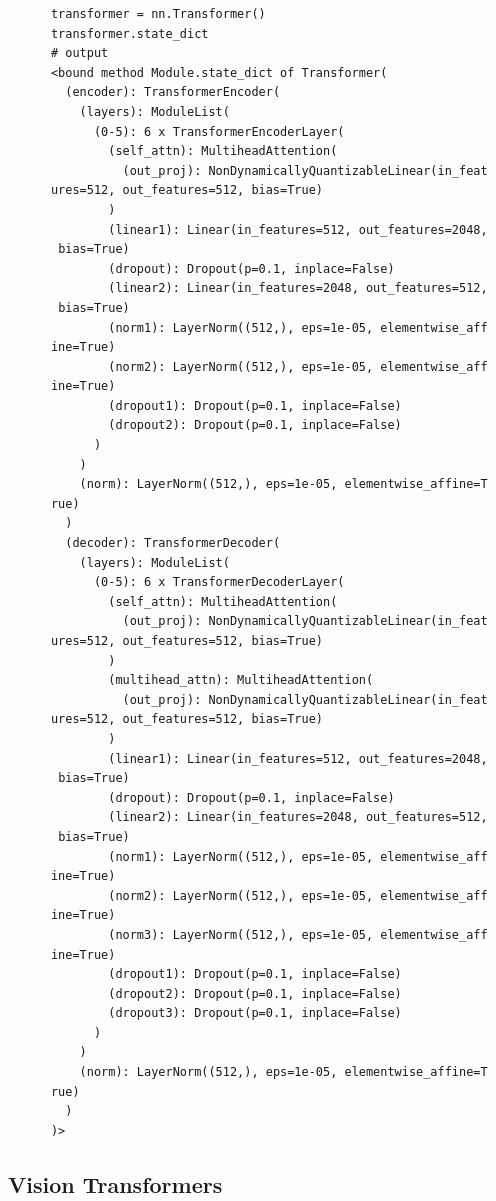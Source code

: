 \documentclass{article}
\begin{document}
    \begin{lstlisting}
      transformer = nn.Transformer()
      transformer.state_dict
      # output 
      <bound method Module.state_dict of Transformer(
        (encoder): TransformerEncoder(
          (layers): ModuleList(
            (0-5): 6 x TransformerEncoderLayer(
              (self_attn): MultiheadAttention(
                (out_proj): NonDynamicallyQuantizableLinear(in_feat
      ures=512, out_features=512, bias=True)
              )
              (linear1): Linear(in_features=512, out_features=2048,
       bias=True)
              (dropout): Dropout(p=0.1, inplace=False)
              (linear2): Linear(in_features=2048, out_features=512,
       bias=True)
              (norm1): LayerNorm((512,), eps=1e-05, elementwise_aff
      ine=True)
              (norm2): LayerNorm((512,), eps=1e-05, elementwise_aff
      ine=True)
              (dropout1): Dropout(p=0.1, inplace=False)
              (dropout2): Dropout(p=0.1, inplace=False)
            )
          )
          (norm): LayerNorm((512,), eps=1e-05, elementwise_affine=T
      rue)
        )
        (decoder): TransformerDecoder(
          (layers): ModuleList(
            (0-5): 6 x TransformerDecoderLayer(
              (self_attn): MultiheadAttention(
                (out_proj): NonDynamicallyQuantizableLinear(in_feat
      ures=512, out_features=512, bias=True)
              )
              (multihead_attn): MultiheadAttention(
                (out_proj): NonDynamicallyQuantizableLinear(in_feat
      ures=512, out_features=512, bias=True)
              )
              (linear1): Linear(in_features=512, out_features=2048,
       bias=True)
              (dropout): Dropout(p=0.1, inplace=False)
              (linear2): Linear(in_features=2048, out_features=512,
       bias=True)
              (norm1): LayerNorm((512,), eps=1e-05, elementwise_aff
      ine=True)
              (norm2): LayerNorm((512,), eps=1e-05, elementwise_aff
      ine=True)
              (norm3): LayerNorm((512,), eps=1e-05, elementwise_aff
      ine=True)
              (dropout1): Dropout(p=0.1, inplace=False)
              (dropout2): Dropout(p=0.1, inplace=False)
              (dropout3): Dropout(p=0.1, inplace=False)
            )
          )
          (norm): LayerNorm((512,), eps=1e-05, elementwise_affine=T
      rue)
        )
      )>
    \end{lstlisting}

\subsection{Vision Transformers} 
\end{document}
